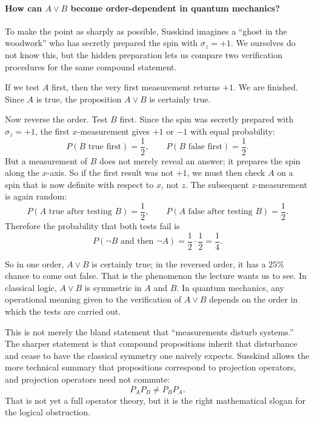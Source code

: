 \paragraph{How can \(A\lor B\) become order-dependent in quantum mechanics?}

To make the point as sharply as possible, Susskind imagines a ``ghost in the woodwork'' who has secretly prepared the spin with \(\sigma_z=+1\). We ourselves do not know this, but the hidden preparation lets us compare two verification procedures for the same compound statement.

If we test \(A\) first, then the very first measurement returns \(+1\). We are finished. Since \(A\) is true, the proposition \(A\lor B\) is certainly true.

Now reverse the order. Test \(B\) first. Since the spin was secretly prepared with \(\sigma_z=+1\), the first \(x\)-measurement gives \(+1\) or \(-1\) with equal probability:
\[
P(B\text{ true first})=\frac12,\qquad
P(B\text{ false first})=\frac12.
\]
But a measurement of \(B\) does not merely reveal an answer; it prepares the spin along the \(x\)-axis. So if the first result was not \(+1\), we must then check \(A\) on a spin that is now definite with respect to \(x\), not \(z\). The subsequent \(z\)-measurement is again random:
\[
P(A\text{ true after testing }B)=\frac12,\qquad
P(A\text{ false after testing }B)=\frac12.
\]
Therefore the probability that both tests fail is
\begin{equation}
P(\neg B\text{ and then }\neg A)=\frac12\cdot\frac12=\frac14.
\end{equation}

So in one order, \(A\lor B\) is certainly true; in the reversed order, it has a \(25\%\) chance to come out false. That is the phenomenon the lecture wants us to see. In classical logic, \(A\lor B\) is symmetric in \(A\) and \(B\). In quantum mechanics, any operational meaning given to the verification of \(A\lor B\) depends on the order in which the tests are carried out.

This is not merely the bland statement that ``measurements disturb systems.'' The sharper statement is that compound propositions inherit that disturbance and cease to have the classical symmetry one naively expects. Susskind allows the more technical summary that propositions correspond to projection operators, and projection operators need not commute:
\begin{equation}
P_A P_B \neq P_B P_A.
\end{equation}
That is not yet a full operator theory, but it is the right mathematical slogan for the logical obstruction.

